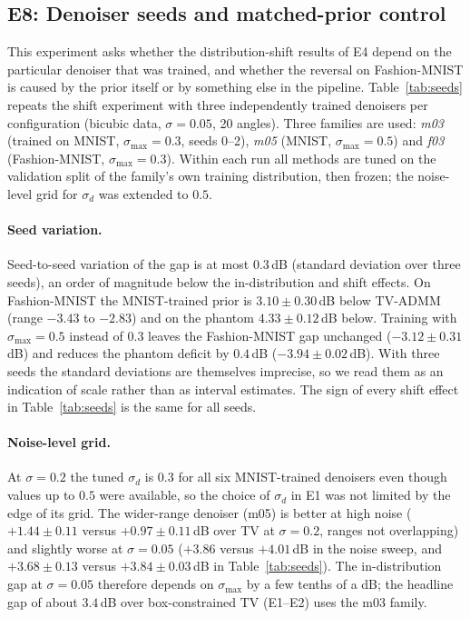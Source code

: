\subsection{E8: Denoiser seeds and matched-prior control}\label{sec:seeds-results}
This experiment asks whether the distribution-shift results of E4 depend on the particular denoiser that was trained, and
whether the reversal on Fashion-MNIST is caused by the prior itself or by something else in the pipeline. Table~\ref{tab:seeds}
repeats the shift experiment with three independently trained denoisers per configuration (bicubic data, $\sigma=0.05$, 20 angles).
Three families are used: \emph{m03} (trained on MNIST, $\sigma_{\max}=0.3$, seeds 0--2), \emph{m05} (MNIST, $\sigma_{\max}=0.5$)
and \emph{f03} (Fashion-MNIST, $\sigma_{\max}=0.3$). Within each run all methods are tuned on the validation split of the
family's own training distribution, then frozen; the noise-level grid for $\sigma_d$ was extended to $0.5$.

\paragraph{Seed variation.} Seed-to-seed variation of the gap is at most $0.3$\,dB (standard deviation over three seeds), an order of
magnitude below the in-distribution and shift effects. On Fashion-MNIST the MNIST-trained prior is $3.10\pm0.30$\,dB below TV-ADMM (range
$-3.43$ to $-2.83$) and on the phantom $4.33\pm0.12$\,dB below. Training with $\sigma_{\max}=0.5$ instead of $0.3$ leaves the Fashion-MNIST gap unchanged ($-3.12\pm0.31$\,dB) and
reduces the phantom deficit by $0.4$\,dB ($-3.94\pm0.02$\,dB). With three seeds the standard
deviations are themselves imprecise, so we read them as an indication of scale rather than as interval estimates.
The sign of every shift effect in Table~\ref{tab:seeds} is the same for all seeds.

\paragraph{Noise-level grid.} At $\sigma=0.2$ the tuned $\sigma_d$ is $0.3$ for all six MNIST-trained denoisers even though values
up to $0.5$ were available, so the choice of $\sigma_d$ in E1 was not limited by the edge of its grid. The wider-range
denoiser (m05) is better at high noise ($+1.44\pm0.11$ versus $+0.97\pm0.11$\,dB over TV at $\sigma=0.2$, ranges not overlapping)
and slightly worse at $\sigma=0.05$ ($+3.86$ versus $+4.01$\,dB in the noise sweep, and $+3.68\pm0.13$ versus $+3.84\pm0.03$\,dB in
Table~\ref{tab:seeds}). The in-distribution gap at $\sigma=0.05$ therefore depends on $\sigma_{\max}$ by a few tenths of a dB; the
headline gap of about $3.4$\,dB over box-constrained TV (E1--E2) uses the m03 family.

